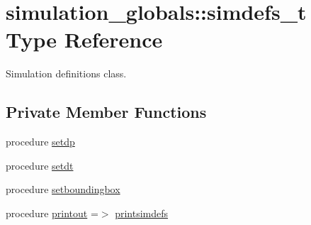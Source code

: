 \hypertarget{structsimulation__globals_1_1simdefs__t}{}\section{simulation\+\_\+globals\+:\+:simdefs\+\_\+t Type Reference}
\label{structsimulation__globals_1_1simdefs__t}


Simulation definitions class.  


\subsection*{Private Member Functions}
\begin{DoxyCompactItemize}
\item 
procedure \mbox{\hyperlink{structsimulation__globals_1_1simdefs__t_ac1951dc05be68a08a70d55b0da627f04}{setdp}}
\item 
procedure \mbox{\hyperlink{structsimulation__globals_1_1simdefs__t_a1e748701b60ee8883871fb3bca30aa4b}{setdt}}
\item 
procedure \mbox{\hyperlink{structsimulation__globals_1_1simdefs__t_aae43bf7d19c5cfceb113c35bc13cca8d}{setboundingbox}}
\item 
procedure \mbox{\hyperlink{structsimulation__globals_1_1simdefs__t_aade8e069ae929a97a9c78cc52d1078f7}{printout}} =$>$ \mbox{\hyperlink{namespacesimulation__globals_ad90d6959da1d43e2cd1febff82187ed5}{printsimdefs}}
\end{DoxyCompactItemize}
